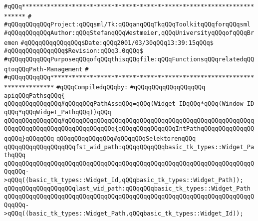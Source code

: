 \label{src/lib/tk/src/paths.api}
\verb|#qQQq***********************************************************************|\newline
\verb|#|\newline
\verb|#qQQqqQQqqQQqProject:qQQqsml/Tk:qQQqanqQQqTkqQQqToolkitqQQqforqQQqsml|\newline
\verb|#qQQqqQQqqQQqAuthor:qQQqStefanqQQqWestmeier,qQQqUniversityqQQqofqQQqBremen|\newline
\verb|#qQQqqQQqqQQqqQQq$Date:qQQq2001/03/30qQQq13:39:15qQQq$|\newline
\verb|#qQQqqQQqqQQqqQQq$Revision:qQQq3.0qQQq$|\newline
\verb|#qQQqqQQqqQQqPurposeqQQqofqQQqthisqQQqfile:qQQqFunctionsqQQqrelatedqQQqtoqQQqPath-Management|\newline
\verb|#|\newline
\verb|#qQQqqQQqqQQq***********************************************************************|\newline
\newline
\verb|#qQQqCompiledqQQqby:|\newline
\verb|#qQQqqQQqqQQqqQQqqQQq|\newline
\newline
\verb|apiqQQqPathsqQQq{|\newline
\newline
\verb|qQQqqQQqqQQqqQQq#qQQqqQQqPathAssqQQq=qQQq(Widget_IDqQQq*qQQq(Window_IDqQQq*qQQqWidget_PathqQQq))qQQq|\newline
\verb|qQQqqQQqqQQqqQQq#qQQqqQQqqQQqqQQqqQQqqQQqqQQqqQQqqQQqqQQqqQQqqQQqqQQqqQQqqQQqqQQqqQQqqQQqqQQqqQQqqQQq{qQQqqQQqqQQqqQQqIntPathqQQqqQQqqQQqqQQqqQQq}qQQqqQQq|\newline
\newline
\verb|qQQqqQQqqQQqqQQq#qQQqqQQqSelektorenqQQq|\newline
\verb|qQQqqQQqqQQqqQQqqQQqfst_wid_path:qQQqqQQqqQQqbasic_tk_types::Widget_PathqQQq|\newline
\verb|qQQqqQQqqQQqqQQqqQQqqQQqqQQqqQQqqQQqqQQqqQQqqQQqqQQqqQQqqQQqqQQqqQQqqQQqqQQq->qQQq((basic_tk_types::Widget_Id,qQQqbasic_tk_types::Widget_Path));|\newline
\newline
\verb|qQQqqQQqqQQqqQQqqQQqlast_wid_path:qQQqqQQqbasic_tk_types::Widget_Path|\newline
\verb|qQQqqQQqqQQqqQQqqQQqqQQqqQQqqQQqqQQqqQQqqQQqqQQqqQQqqQQqqQQqqQQqqQQqqQQqqQQq->qQQq((basic_tk_types::Widget_Path,qQQqbasic_tk_types::Widget_Id));|\newline
